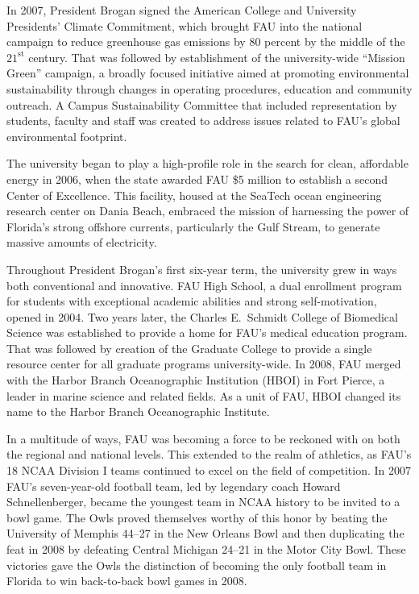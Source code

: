 \documentclass[phd, 12pt, print]{fauthesis}
\begin{document}
In 2007, President Brogan signed the American College and University Presidents' Climate Commitment, which brought FAU into the national campaign to reduce greenhouse gas emissions by 80 percent by the middle of the $21^{\mathrm{st}}$ century.  That was followed by establishment of the university-wide ``Mission Green'' campaign, a broadly focused initiative aimed at promoting environmental sustainability through changes in operating procedures, education and community outreach.  A Campus Sustainability Committee that included representation by students, faculty and staff was created to address issues related to FAU's global environmental footprint.

The university began to play a high-profile role in the search for clean, affordable energy in 2006, when the state awarded FAU \$5 million to establish a second Center of Excellence.  This facility, housed at the SeaTech ocean engineering research center on Dania Beach, embraced the mission of harnessing the power of Florida's strong offshore currents, particularly the Gulf Stream, to generate massive amounts of electricity.

Throughout President Brogan's first six-year term, the university grew in ways both conventional and innovative.  FAU High School, a dual enrollment program for students with exceptional academic abilities and strong self-motivation, opened in 2004.  Two years later, the Charles E.\ Schmidt College of Biomedical Science was established to provide a home for FAU's medical education program.  That was followed by creation of the Graduate College to provide a single resource center for all graduate programs university-wide.  In 2008, FAU merged with the Harbor Branch Oceanographic Institution (HBOI) in Fort Pierce, a leader in marine science and related fields.  As a unit of FAU, HBOI changed its name to the Harbor Branch Oceanographic Institute.

In a multitude of ways, FAU was becoming a force to be reckoned with on both the regional and national levels.  This extended to the realm of athletics, as FAU's 18 NCAA Division I teams continued to excel on the field of competition.  In 2007 FAU's seven-year-old football team, led by legendary coach Howard Schnellenberger, became the youngest team in NCAA history to be invited to a bowl game.  The Owls proved themselves worthy of this honor by beating the University of Memphis 44--27 in the New Orleans Bowl and then duplicating the feat in 2008 by defeating Central Michigan 24--21 in the Motor City Bowl.  These victories gave the Owls the distinction of becoming the only football team in Florida to win back-to-back bowl games in 2008.
\end{document}
